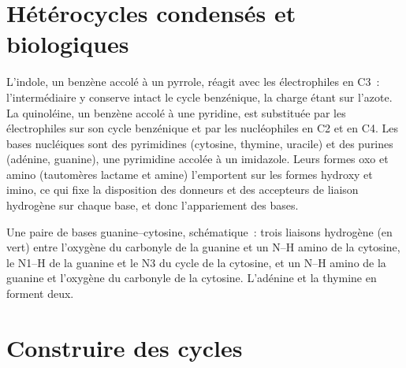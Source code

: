 \section{Hétérocycles condensés et biologiques}

L'indole, un benzène accolé à un pyrrole, réagit avec les électrophiles en
C3~: l'intermédiaire y conserve intact le cycle benzénique, la charge étant
sur l'azote. La quinoléine, un benzène accolé à une pyridine, est
substituée par les électrophiles sur son cycle benzénique et par les
nucléophiles en C2 et en C4. Les bases nucléiques sont des pyrimidines
(cytosine, thymine, uracile) et des purines (adénine, guanine), une
pyrimidine accolée à un imidazole. Leurs formes oxo et amino (tautomères
lactame et amine) l'emportent sur les formes hydroxy et imino, ce qui fixe
la disposition des donneurs et des accepteurs de liaison hydrogène sur
chaque base, et donc l'appariement des bases.

\begin{omfigure}

{\small Une paire de bases guanine--cytosine, schématique~: trois liaisons
hydrogène (en vert) entre l'oxygène du carbonyle de la guanine et un N--H
amino de la cytosine, le N1--H de la guanine et le N3 du cycle de la
cytosine, et un N--H amino de la guanine et l'oxygène du carbonyle de la
cytosine. L'adénine et la thymine en forment deux.}
\end{omfigure}

\section{Construire des cycles}

